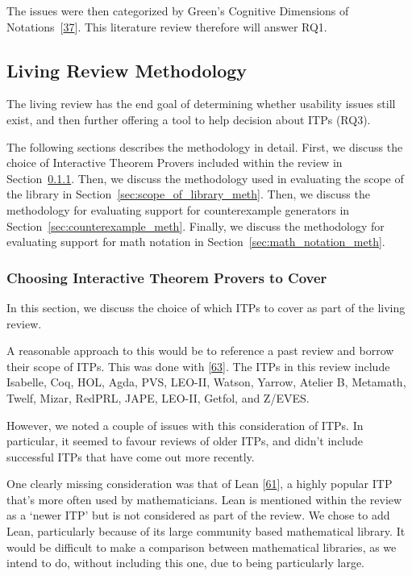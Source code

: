 \documentclass[
]{article}
\begin{document}
The issues were then categorized by Green's Cognitive Dimensions of
Notations~{[}\protect\hyperlink{ref-green_usability_1996}{37}{]}. This
literature review therefore will answer RQ1.

\hypertarget{sec:living_review_meth}{%
\subsection{Living Review Methodology}\label{sec:living_review_meth}}

The living review has the end goal of determining whether usability
issues still exist, and then further offering a tool to help decision
about ITPs (RQ3).

The following sections describes the methodology in detail. First, we
discuss the choice of Interactive Theorem Provers included within the
review in Section~\ref{sec:chosing_itps}. Then, we discuss the
methodology used in evaluating the scope of the library in
Section~\ref{sec:scope_of_library_meth}. Then, we discuss the
methodology for evaluating support for counterexample generators in
Section~\ref{sec:counterexample_meth}. Finally, we discuss the
methodology for evaluating support for math notation in
Section~\ref{sec:math_notation_meth}.

\hypertarget{sec:chosing_itps}{%
\subsubsection{Choosing Interactive Theorem Provers to
Cover}\label{sec:chosing_itps}}

In this section, we discuss the choice of which ITPs to cover as part of
the living review.

A reasonable approach to this would be to reference a past review and
borrow their scope of ITPs. This was done with
{[}\protect\hyperlink{ref-nawaz_survey_2019}{63}{]}. The ITPs in this
review include Isabelle, Coq, HOL, Agda, PVS, LEO-II, Watson, Yarrow,
Atelier B, Metamath, Twelf, Mizar, RedPRL, JAPE, LEO-II, Getfol, and
Z/EVES.

However, we noted a couple of issues with this consideration of ITPs. In
particular, it seemed to favour reviews of older ITPs, and didn't
include successful ITPs that have come out more recently.

One clearly missing consideration was that of Lean
{[}\protect\hyperlink{ref-Lean}{61}{]}, a highly popular ITP that's more
often used by mathematicians. Lean is mentioned within the review as a
`newer ITP' but is not considered as part of the review. We chose to add
Lean, particularly because of its large community based mathematical
library. It would be difficult to make a comparison between mathematical
libraries, as we intend to do, without including this one, due to being
particularly large.
\end{document}
